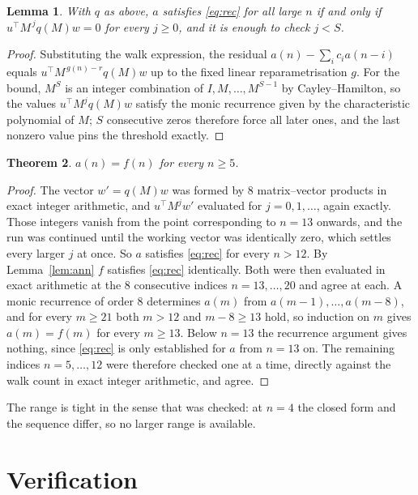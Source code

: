 \documentclass[11pt,a4paper]{article}
\theoremstyle{plain}
\newtheorem{theorem}{Theorem}
\newtheorem{lemma}[theorem]{Lemma}
\theoremstyle{definition}
\begin{document}
\begin{lemma}\label{lem:crit}
With $q$ as above, $a$ satisfies \eqref{eq:rec} for all large $n$ if and only if
$u^{\!\top}M^{\,j}q(M)w=0$ for every $j\ge0$, and it is enough to check $j<S$.
\end{lemma}

\begin{proof}
Substituting the walk expression, the residual $a(n)-\sum_ic_ia(n-i)$ equals
$u^{\!\top}M^{\,g(n)-r}q(M)w$ up to the fixed linear reparametrisation $g$. For the bound,
$M^{S}$ is an integer combination of $I,M,\dots,M^{S-1}$ by Cayley--Hamilton, so the values
$u^{\!\top}M^{j}q(M)w$ satisfy the monic recurrence given by the characteristic polynomial of
$M$; $S$ consecutive zeros therefore force all later ones, and the last nonzero value pins the
threshold exactly.
\end{proof}

\begin{theorem}
$a(n)=f(n)$ for every $n\ge5$.
\end{theorem}

\begin{proof}
The vector $w'=q(M)w$ was formed by $8$ matrix--vector products in exact integer
arithmetic, and $u^{\!\top}M^{j}w'$ evaluated for $j=0,1,\dots$, again exactly. Those integers
vanish from the point corresponding to $n=13$ onwards, and the run was continued until the
working vector was identically zero, which settles every larger $j$ at once. So $a$ satisfies
\eqref{eq:rec} for every $n>12$. By Lemma~\ref{lem:ann} $f$ satisfies \eqref{eq:rec}
identically. Both were then evaluated in exact arithmetic at the $8$ consecutive indices
$n=13,\dots,20$ and agree at each. A monic recurrence of order $8$
determines $a(m)$ from $a(m-1),\dots,a(m-8)$, and for every $m\ge21$ both
$m>12$ and $m-8\ge13$ hold, so induction on $m$ gives $a(m)=f(m)$ for every
$m\ge13$.
Below $n=13$ the recurrence argument gives nothing, since \eqref{eq:rec} is only
established for $a$ from $n=13$ on. The remaining indices $n=5,\dots,12$ were
therefore checked one at a time, directly against the walk count in exact integer arithmetic,
and agree.
\end{proof}

The range is tight in the sense that was checked: at $n=4$ the closed form and the sequence differ, so no larger range is available.

\section{Verification}
\end{document}
